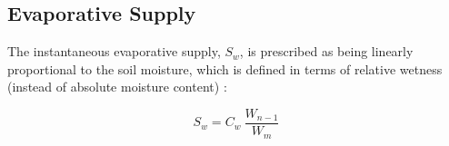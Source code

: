 \subsection{Evaporative Supply}
\label{sec:sw}
The instantaneous evaporative supply, $S_w$, is prescribed as being linearly proportional to the soil moisture, which is defined in terms of relative wetness (instead of absolute moisture content) \parencite{federer82}:

%
\begin{equation}
\label{eq:sw}
    S_{w} = C_w\: \frac{W_{n-1}}{W_m}
\end{equation}

